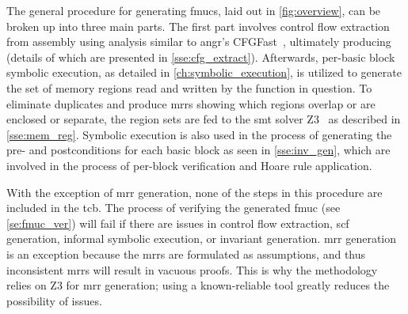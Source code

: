 The general procedure for generating \acp{fmuc}, laid out in \cref{fig:overview},
can be broken up into three main parts.
The first part involves control flow extraction from assembly using  analysis
similar to angr's CFGFast~\citep{shoshitaishvili2016state},%
ultimately producing  (details of which are presented
in \cref{sse:cfg_extract}).
Afterwards, per-basic block symbolic execution,%
%
as detailed in \cref{ch:symbolic_execution},
is utilized to generate the set of memory regions%
read and written by the function in question.
To eliminate duplicates and produce \acp{mrr}
showing which regions overlap or are enclosed or separate,%
the region sets are fed to the \ac{smt} solver Z3~\citep{de2008z3}
as described in \cref{sse:mem_reg}.
Symbolic execution is also used in the process of generating
the pre- and postconditions for each basic block as seen in \cref{sse:inv_gen},
which are involved in the process of per-block verification
and Hoare rule application.%

With the exception of \ac{mrr} generation,
none of the steps in this procedure are included in the \ac{tcb}.
The process of verifying the generated \ac{fmuc} (see \cref{se:fmuc_ver})
will fail if there are issues in control flow extraction,
\ac{scf} generation, informal symbolic execution, or invariant generation.
\Ac{mrr} generation is an exception
because the \acp{mrr} are formulated as assumptions,
and thus inconsistent \acp{mrr} will result in vacuous proofs.
This is why the methodology relies on Z3 for \ac{mrr} generation;%
using a known-reliable tool greatly reduces the possibility of issues.

